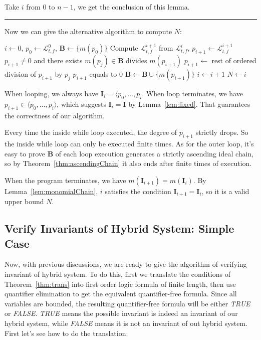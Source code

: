\documentclass{jssc}
\newcommand{\rulex}{\hfill\rule{1mm}{3mm}}
\begin{document}
Take $i$ from $0$ to $n-1$, we get the conclusion of this lemma.
\rulex

Now we can give the alternative algorithm to compute $N$:

\begin{codebox}
\li 	$i \gets 0$, $p_0 \gets \mathcal{L}_{t, f}^0$, $\boldsymbol{B} \gets \{ m(p_0) \}$
\li 	\While {}
\li		\Do
			Compute $\mathcal{L}_{t, f}^{i+1}$ from $\mathcal{L}_{t, f}^i$, $p_{i+1} \gets \mathcal{L}_{t, f}^{i+1}$
\li			\While $p_{i+1} \neq 0$ and there exists $m(p_j) \in \boldsymbol{B}$ divides $m(p_{i+1})$
\li				\Do
					$p_{i+1} \gets$ rest of ordered division of $p_{i+1}$ by $p_j$
				\End
\li			\If $p_{i+1}$ equals to $0$
\li				\Then
				\End
\li			$\boldsymbol{B} \gets \boldsymbol{B} \cup \{ m(p_{i+1}) \}$
\li			$i \gets i+1$
		\End
\li	$N \gets i$
\end{codebox}

When looping, we always have $\boldsymbol{I}_i = \langle p_0, \dots, p_i$. When loop terminates, we have $p_{i+1} \in \langle p_0, \dots, p_i \rangle$, which suggests $\boldsymbol{I}_i = \boldsymbol{I}$ by Lemma~\ref{lem:fixed}. That guarantees the correctness of our algorithm. 

Every time the inside while loop executed, the degree of $p_{i+1}$ strictly drops. So the inside while loop can only be executed finite times. As for the outer loop, it's easy to prove $\boldsymbol{B}$ of each loop execution generates a strictly ascending ideal chain, so by Theorem~\ref{thm:ascendingChain} it also ends after finite times of execution. 

When the program terminates, we have $m(\boldsymbol{I}_{i+1}) = m(\boldsymbol{I}_i)$. By Lemma~\ref{lem:monomialChain}, $i$ satisfies the condition $\boldsymbol{I}_{i+1} = \boldsymbol{I}_i$, so it is a valid upper bound $N$.

\subsection{Verify Invariants of Hybrid System: Simple Case}
Now, with previous discussions, we are ready to give the algorithm of verifying invariant of hybrid system. To do this, first we translate the conditions of Theorem~\ref{thm:trans} into first order logic formula of finite length, then use quantifier elimination to get the equivalent quantifier-free formula. Since all variables are bounded, the resulting quantifier-free formula will be either \emph{TRUE} or \emph{FALSE}. \emph{TRUE} means the possible invariant is indeed an invariant of our hybrid system, while \emph{FALSE} means it is not an invariant of out hybrid system. First let's see how to do the translation: 
\end{document}
